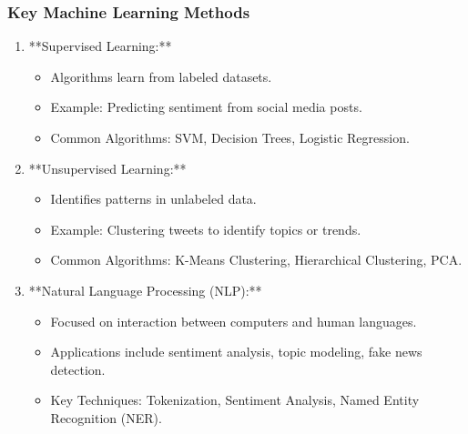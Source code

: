 \documentclass{beamer}
\begin{document}
\begin{frame}[fragile]
    \frametitle{Key Machine Learning Methods}
    \begin{enumerate}
        \item **Supervised Learning:**
            \begin{itemize}
                \item Algorithms learn from labeled datasets.
                \item Example: Predicting sentiment from social media posts.
                \item Common Algorithms: SVM, Decision Trees, Logistic Regression.
            \end{itemize}
        \item **Unsupervised Learning:**
            \begin{itemize}
                \item Identifies patterns in unlabeled data.
                \item Example: Clustering tweets to identify topics or trends.
                \item Common Algorithms: K-Means Clustering, Hierarchical Clustering, PCA.
            \end{itemize}
        \item **Natural Language Processing (NLP):**
            \begin{itemize}
                \item Focused on interaction between computers and human languages.
                \item Applications include sentiment analysis, topic modeling, fake news detection.
                \item Key Techniques: Tokenization, Sentiment Analysis, Named Entity Recognition (NER).
            \end{itemize}
    \end{enumerate}
\end{frame}
\end{document}
